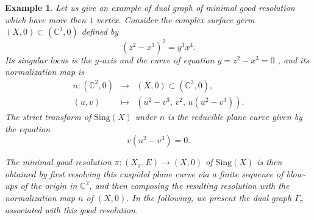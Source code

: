 \documentclass[reqno,dvipsnames,12pt]{amsart}
\newtheorem{exam}[thm]{Example}
\begin{document}
\begin{exam}\label{exampledur}
    Let us give an example of dual graph of minimal good resolution which have more then $1$ vertex. Consider the complex surface germ 
\((X,0) \subset (\mathbb{C}^3,0)\) defined by
\[
(z^2 - x^3)^2 = y^3 x^4.
\] 
Its singular locus is the \(y\)-axis and the curve of equation $y=z^2-x^3=0$ , and its normalization map is
\[
\begin{array}{rcl}
n : (\mathbb{C}^2,0) &\longrightarrow& (X,0) \subset (\mathbb{C}^3,0),\\[1mm]
(u,v) &\longmapsto& (u^2 - v^3,\, v^2,\, u(u^2 - v^3)).
\end{array}
\]  
The strict transform of \(\mathrm{Sing}(X)\) under \(n\) is the reducible plane curve  given by the equation
\[
v(u^2 - v^3) = 0.
\]  

The minimal good resolution 
\(\pi : (X_\pi, E) \longrightarrow (X,0)\) of  \(\mathrm{Sing}(X)\) is then obtained by first resolving this cuspidal plane curve via a finite sequence of blow-ups of the origin in \(\mathbb{C}^2\), and then composing the resulting resolution with the normalization map \(n\) of \((X,0)\). In the following, we present the dual graph \(\Gamma_\pi\) associated with this good resolution.
\begin{figure}[H]
\centering
{}
\end{figure}
\end{exam}
\end{document}

